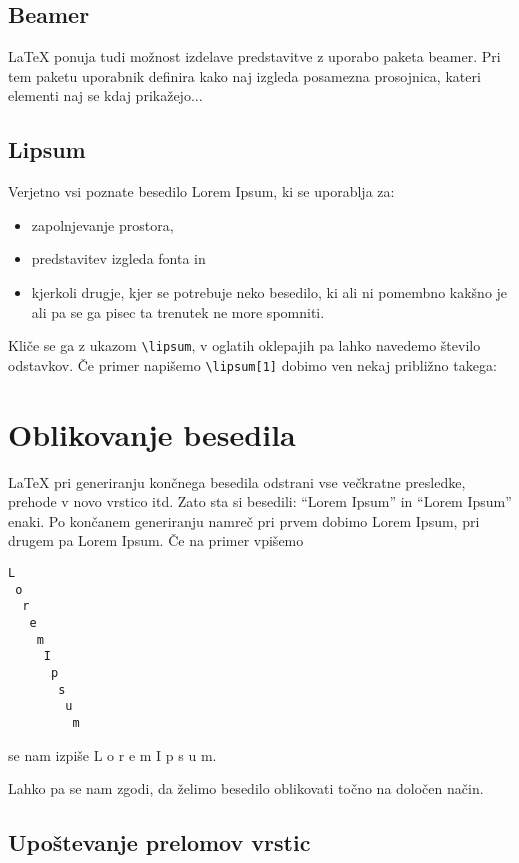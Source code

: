\documentclass[a4paper]{book}
\newcommand\tbs{\textbackslash{}}
\begin{document}
\subsection{Beamer}
\LaTeX{} ponuja tudi možnost izdelave predstavitve z uporabo paketa beamer. Pri tem paketu uporabnik definira kako naj izgleda posamezna prosojnica, kateri elementi naj se kdaj prikažejo...

\subsection{Lipsum}
Verjetno vsi poznate besedilo Lorem Ipsum, ki se uporablja za:
\begin{itemize}
\item zapolnjevanje prostora,
\item predstavitev izgleda fonta in
\item kjerkoli drugje, kjer se potrebuje neko besedilo, ki ali ni pomembno kakšno je ali pa se ga pisec ta trenutek ne more spomniti.
\end{itemize}

Kliče se ga z ukazom \texttt{\tbs{}lipsum}, v oglatih oklepajih pa lahko navedemo število odstavkov.
Če primer napišemo \texttt{\tbs{}lipsum[1]} dobimo ven nekaj približno takega:\\

\lipsum[1]


\section{Oblikovanje besedila}


\LaTeX{} pri generiranju končnega besedila odstrani vse večkratne presledke, prehode v novo vrstico itd. Zato sta si besedili: ``Lorem{ }{ }{ }{ }{ }{ }{ }{ }{ }{ }{ }{ }{ }{ }{ }{ }Ipsum'' in ``Lorem Ipsum'' enaki. Po končanem generiranju namreč pri prvem dobimo Lorem               Ipsum, pri drugem pa Lorem Ipsum. Če na primer vpišemo
\begin{verbatim}
L
 o
  r
   e
    m
     I
      p
       s
        u
         m
\end{verbatim}
se nam izpiše
L
 o
  r
   e
    m
     I
      p
       s
        u
         m.

Lahko pa se nam zgodi, da želimo besedilo oblikovati točno na določen način.

\subsection{Upoštevanje prelomov vrstic}
\end{document}
